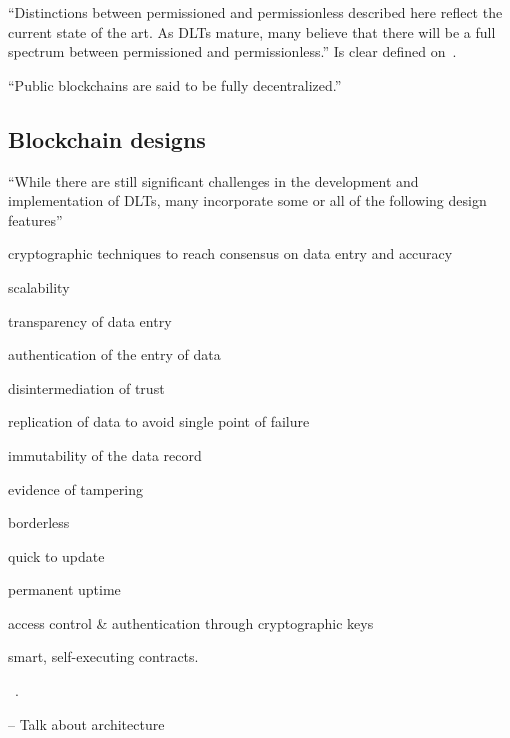 ``Distinctions between permissioned and permissionless described here reflect the current state of the art. As DLTs mature, many believe that there will be a full spectrum between permissioned and permissionless.''
Is clear defined on~\cite{uk2016}.

``Public blockchains are said to be fully decentralized.''~\cite{itu2017}



\subsection{Blockchain designs~\label{ssec:block-design}}

``While there are still significant challenges in the development and implementation of DLTs, many incorporate some or all of the following design features''
\begin{descriptive}
	\item cryptographic techniques to reach consensus on data entry and accuracy
    \item scalability
    \item transparency of data entry
    \item authentication of the entry of data
    \item disintermediation of trust
    \item replication of data to avoid single point of failure
    \item immutability of the data record
    \item evidence of tampering
    \item borderless
    \item quick to update
    \item permanent uptime
    \item access control \& authentication through cryptographic keys
    \item smart, self-executing contracts.
\end{descriptive}
~\cite{itu2017}.

-- Talk about architecture


